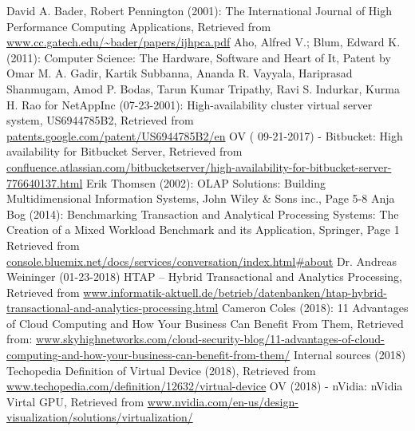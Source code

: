

\begin{thebibliography}{..........}
   	 	David A. Bader, Robert Pennington (2001): 
                               The International Journal of High Performance Computing Applications,
                               Retrieved from \url{www.cc.gatech.edu/~bader/papers/ijhpca.pdf}
   		Aho, Alfred V.; Blum, Edward K. (2011):
                              	Computer Science: The Hardware, Software and Heart of It,
   		Patent by Omar M. A. Gadir, Kartik Subbanna, Ananda R. Vayyala, Hariprasad Shanmugam, Amod P. Bodas, Tarun Kumar Tripathy, Ravi S. Indurkar, Kurma H. Rao  for NetAppInc (07-23-2001):
   				High-availability cluster virtual server system,
   				US6944785B2,
                              	Retrieved from \url{patents.google.com/patent/US6944785B2/en}
   		OV ( 09-21-2017) - Bitbucket:
                              	High availability for Bitbucket Server,
                              	Retrieved from \url{confluence.atlassian.com/bitbucketserver/high-availability-for-bitbucket-server-776640137.html}
   		Erik Thomsen (2002):
   				OLAP Solutions: Building Multidimensional Information Systems,
   				John Wiley \& Sons inc.,
   				Page 5-8
   		Anja Bog (2014):
   				Benchmarking Transaction and Analytical Processing Systems: The Creation of a Mixed Workload Benchmark and its Application,
   				Springer,
   				Page 1
   				Retrieved from \url{console.bluemix.net/docs/services/conversation/index.html#about}
   		Dr. Andreas Weininger (01-23-2018)
                              	HTAP – Hybrid Transactional and Analytics Processing,
                              	Retrieved from \url{www.informatik-aktuell.de/betrieb/datenbanken/htap-hybrid-transactional-and-analytics-processing.html}
   		Cameron Coles (2018):
   				11 Advantages of Cloud Computing and How Your Business Can Benefit From Them,
   				Retrieved from: \href{www.skyhighnetworks.com/cloud-security-blog/11-advantages-of-cloud-computing-and-how-your-business-can-benefit-from-them/}{www.skyhighnetworks.com/cloud-security-blog/11-advantages-of-cloud-computing-and-how-your-business-can-benefit-from-them/}
   		Internal sources (2018)
   	Techopedia Definition of Virtual Device (2018),
   				Retrieved from \url{www.techopedia.com/definition/12632/virtual-device}
   	OV (2018) - nVidia:
   				nVidia Virtal GPU,
   				Retrieved from \url{www.nvidia.com/en-us/design-visualization/solutions/virtualization/} 

\end{thebibliography}
